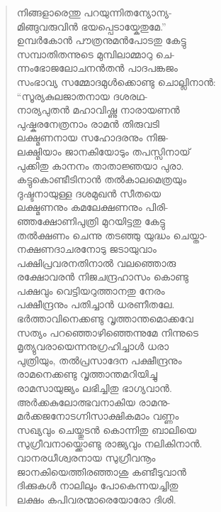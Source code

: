 \begin{verse}
നിങ്ങളാരെന്തു പറയുന്നിതന്യോന്യ-\\
മിങ്ങുവരുവിന്‍ ഭയപ്പെടായ്കേതുമേ.”\\
ഉമ്പര്‍കോന്‍ പൗത്രനുമന്‍പോടതു കേട്ടു\\
സമ്പാതിതന്നുടെ മുമ്പിലാമ്മാറു ചെ-\\
ന്നംഭോജലോചനന്‍തന്‍ പാദപങ്കജം\\
സംഭാവ്യ സമ്മോദമുള്‍ക്കൊണ്ടു ചൊല്ലിനാന്‍:\\
“സൂര്യകുലജാതനായ ദശരഥ-\\
നാര്യപുതന്‍ മഹാവിഷ്ണു നാരായണന്‍\\
പുഷ്കരനേത്രനാം രാമന്‍ തിരുവടി\\
ലക്ഷ്മണനായ സഹോദരനും നിജ-\\
ലക്ഷ്മിയാം ജാനകിയോടും തപസ്സിനായ്\\
പുക്കിതു കാനനം താതാജ്ഞയാ പുരാ.\\
കട്ടുകൊണ്ടീടിനാന്‍ തല്‍കാലമെത്രയും\\
ദുഷ്ടനായുള്ള ദശമുഖന്‍ സീതയെ\\
ലക്ഷ്മണനും കമലേക്ഷണനും പിരി-\\
ഞ്ഞക്ഷോണിപുത്രി മുറയിട്ടതു കേട്ടു\\
തല്‍ക്ഷണം ചെന്നു തടഞ്ഞു യുദ്ധം ചെയ്താ-\\
നക്ഷണദാചരനോടു ജടായുവാം\\
പക്ഷിപ്രവരനതിനാല്‍ വലഞ്ഞൊരു\\
രക്ഷോവരന്‍ നിജചന്ദ്രഹാസം കൊണ്ടു\\
പക്ഷവും വെട്ടിയറുത്താനതു നേരം\\
പക്ഷീന്ദ്രനും പതിച്ചാന്‍ ധരണീതലേ.\\
ഭര്‍ത്താവിനെക്കണ്ടു വൃത്താന്തമൊക്കവേ\\
സത്യം പറഞ്ഞൊഴിഞ്ഞെന്നുമേ നിന്നുടെ\\
മൃത്യുവരായെന്നനുഗ്രഹിച്ചാള്‍ ധരാ\\
പുത്രിയും, തല്‍പ്രസാദേന പക്ഷീന്ദ്രനും\\
രാമനെക്കണ്ടു വൃത്താന്തമറിയിച്ചു\\
രാമസായുജ്യം ലഭിച്ചിതു ഭാഗ്യവാന്‍.\\
അര്‍ക്കകുലോത്ഭവനാകിയ രാമനു-\\
മര്‍ക്കജനോടഗ്നിസാക്ഷികമാം വണ്ണം\\
സഖ്യവും ചെയ്തുടന്‍ കൊന്നിതു ബാലിയെ\\
സുഗ്രീവനായ്ക്കൊണ്ടു രാജ്യവും നലികിനാന്‍.\\
വാനരധീശ്വരനായ സുഗ്രീവനൂം\\
ജാനകിയെത്തിരഞ്ഞാശു കണ്ടീടുവാന്‍\\
ദിക്കുകള്‍ നാലിലും പോകെന്നയച്ചിതു\\
ലക്ഷം കപിവരന്മാരെയോരോ ദിശി.\\

\end{verse}
